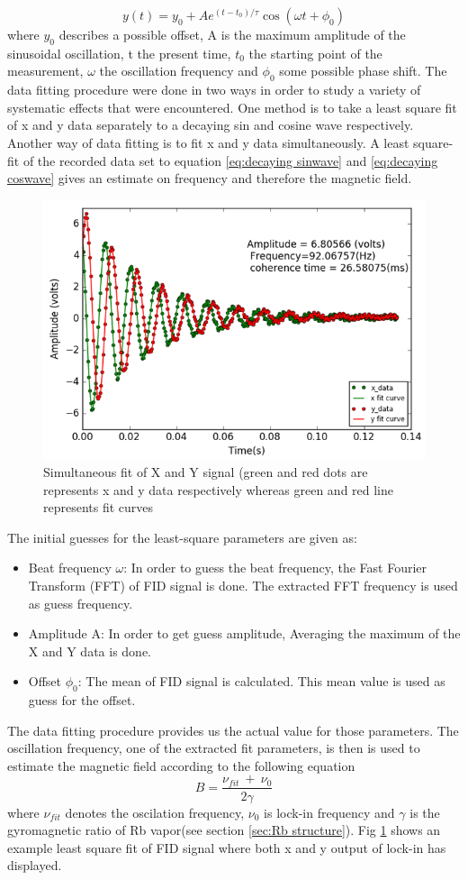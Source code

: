   \begin{equation}
 y(t) = y_0 + A   e^{(t-t_0)/\tau}\cos(\omega t + \phi_0)\label{eq:decaying coswave}
\end{equation}
where $y_0$ describes a possible offset, A is the maximum amplitude of the sinusoidal oscillation,
t the present time, $t_0$ the starting point of the measurement, $\omega$ the oscillation frequency and $\phi_0$  some possible phase shift. The data fitting procedure were done in two ways in order to study a variety of systematic effects that were encountered. One method is to take a least square fit of x and y data separately to a decaying sin and cosine wave respectively. Another way of data fitting is to fit x and y data simultaneously. A least square-fit of the recorded data set to equation \ref{eq:decaying sinwave} and \ref{eq:decaying coswave} gives an estimate on frequency and  therefore the magnetic field.
\begin{figure}[h]
\centering\includegraphics[width=0.55\linewidth]{figures/fid_simultaneous}
\caption{ Simultaneous fit of X and Y signal (green and red dots are represents x and y data respectively whereas green and red line  represents fit curves\label{Fig:FID fit}}
\end{figure}
  

The initial guesses for the least-square parameters are given
as:
\begin{itemize}
\item
Beat frequency $\omega$: In order to guess the beat frequency, the Fast Fourier Transform (FFT) of FID signal is done. The extracted FFT frequency is used as guess frequency.
\item
Amplitude A: In order to get guess amplitude, Averaging the maximum of the X and Y data is done.
\item
Offset $\phi_0$: The mean of FID signal is calculated. This mean value is used as guess for the offset. 

\end{itemize}
The data fitting procedure provides us the actual value for those parameters. The oscillation frequency, one of the extracted fit parameters, is then is used to estimate the magnetic field according to the following equation
\begin{equation}
 B= \frac{\nu_{fit}~ +~\nu_0}{2\gamma}\label{eq:field}
\end{equation}
 where $\nu_{fit}$ denotes the oscilation  frequency, $\nu_{0}$ is lock-in frequency and $\gamma$ is the gyromagnetic ratio of Rb vapor(see section \ref{sec:Rb structure}). Fig \ref{Fig:FID fit} shows an example least square fit of FID signal where both x and y output of lock-in has displayed.
 
